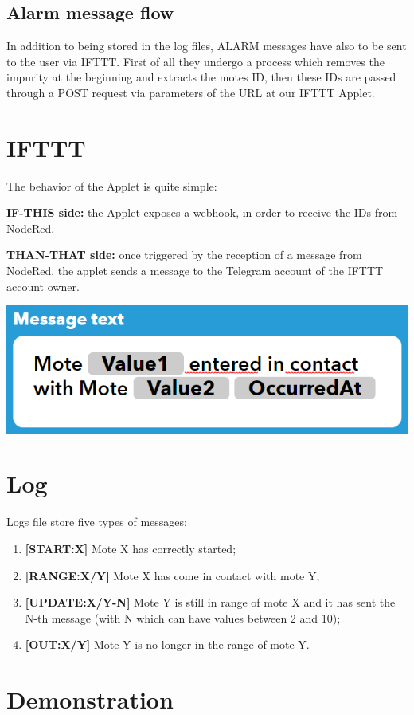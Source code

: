 \documentclass[12pt]{article}
\begin{document}
\subsection{Alarm message flow}
In addition to being stored in the log files, ALARM messages have also to be sent to the user via IFTTT. \newline
First of all they undergo a process which removes the impurity at the beginning and extracts the motes ID, then these IDs are passed through a POST request via parameters of the URL at our IFTTT Applet.

\section{IFTTT}
The behavior of the Applet is quite simple:
\begin{itemize}
  \item{\textbf{IF-THIS side:} the Applet exposes a webhook, in order to receive the IDs from NodeRed.
  \item {\textbf{THAN-THAT side:} once triggered by the reception of a message from NodeRed, the applet sends a message to the Telegram account of the IFTTT account owner.}}
\end{itemize}

\includegraphics[scale=0.8]{Message_Text.PNG}

\section{Log}

Logs file store five types of messages:
\begin{enumerate}
\item \textbf{[START:X]} Mote X has correctly started;
\item \textbf{[RANGE:X/Y]} Mote X has come in contact with mote Y;
\item \textbf{[UPDATE:X/Y-N]} Mote Y is still in range of mote X and it has sent the N-th message (with N which can have values between 2 and 10);
\item \textbf{[OUT:X/Y]} Mote Y is no longer in the range of mote Y.
\end{enumerate}

\section{Demonstration}
\end{document}
